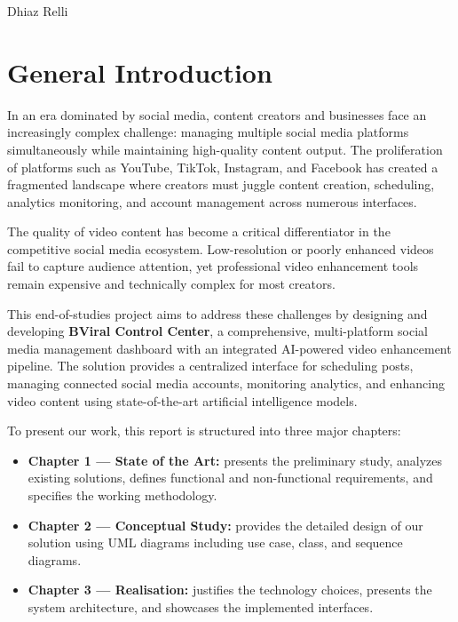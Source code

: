 \documentclass[12pt,a4paper]{report}
\begin{document}
\vspace{1cm}
\hfill Dhiaz Relli

\tableofcontents
\listoffigures
\listoftables

\chapter*{General Introduction}

In an era dominated by social media, content creators and businesses face an increasingly complex challenge: managing multiple social media platforms simultaneously while maintaining high-quality content output. The proliferation of platforms such as YouTube, TikTok, Instagram, and Facebook has created a fragmented landscape where creators must juggle content creation, scheduling, analytics monitoring, and account management across numerous interfaces.

The quality of video content has become a critical differentiator in the competitive social media ecosystem. Low-resolution or poorly enhanced videos fail to capture audience attention, yet professional video enhancement tools remain expensive and technically complex for most creators.

This end-of-studies project aims to address these challenges by designing and developing \textbf{BViral Control Center}, a comprehensive, multi-platform social media management dashboard with an integrated AI-powered video enhancement pipeline. The solution provides a centralized interface for scheduling posts, managing connected social media accounts, monitoring analytics, and enhancing video content using state-of-the-art artificial intelligence models.

To present our work, this report is structured into three major chapters:

\begin{itemize}
    \item \textbf{Chapter 1 --- State of the Art:} presents the preliminary study, analyzes existing solutions, defines functional and non-functional requirements, and specifies the working methodology.
    \item \textbf{Chapter 2 --- Conceptual Study:} provides the detailed design of our solution using UML diagrams including use case, class, and sequence diagrams.
    \item \textbf{Chapter 3 --- Realisation:} justifies the technology choices, presents the system architecture, and showcases the implemented interfaces.
\end{itemize}
\end{document}
